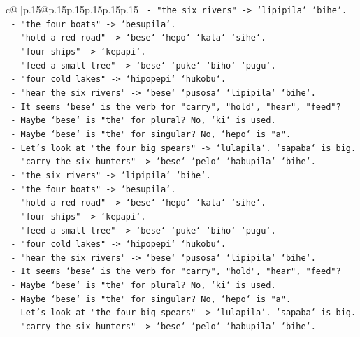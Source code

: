 \documentclass{article}
\begin{document}
{\begin{supertabular}{c@{$\;$}|p{.15\linewidth}@{}p{.15\linewidth}p{.15\linewidth}p{.15\linewidth}p{.15\linewidth}p{.15\linewidth}}
{{{\texttt{    {-} "the six rivers" {-}> `lipipila` `bihe`.} \\
\texttt{    {-} "the four boats" {-}> `besupila`.} \\
\texttt{    {-} "hold a red road" {-}> `bese` `hepo` `kala` `sihe`.} \\
\texttt{    {-} "four ships" {-}> `kepapi`.} \\
\texttt{    {-} "feed a small tree" {-}> `bese` `puke` `biho` `pugu`.} \\
\texttt{    {-} "four cold lakes" {-}> `hipopepi` `hukobu`.} \\
\texttt{    {-} "hear the six rivers" {-}> `bese` `pusosa` `lipipila` `bihe`.} \\
\texttt{    {-} It seems `bese` is the verb for "carry", "hold", "hear", "feed"?} \\
\texttt{    {-} Maybe `bese` is "the" for plural? No, `ki` is used.} \\
\texttt{    {-} Maybe `bese` is "the" for singular? No, `hepo` is "a".} \\
\texttt{    {-} Let's look at "the four big spears" {-}> `lulapila`. `sapaba` is big.} \\
\texttt{    {-} "carry the six hunters" {-}> `bese` `pelo` `habupila` `bihe`.} \\
\texttt{    {-} "the six rivers" {-}> `lipipila` `bihe`.} \\
\texttt{    {-} "the four boats" {-}> `besupila`.} \\
\texttt{    {-} "hold a red road" {-}> `bese` `hepo` `kala` `sihe`.} \\
\texttt{    {-} "four ships" {-}> `kepapi`.} \\
\texttt{    {-} "feed a small tree" {-}> `bese` `puke` `biho` `pugu`.} \\
\texttt{    {-} "four cold lakes" {-}> `hipopepi` `hukobu`.} \\
\texttt{    {-} "hear the six rivers" {-}> `bese` `pusosa` `lipipila` `bihe`.} \\
\texttt{    {-} It seems `bese` is the verb for "carry", "hold", "hear", "feed"?} \\
\texttt{    {-} Maybe `bese` is "the" for plural? No, `ki` is used.} \\
\texttt{    {-} Maybe `bese` is "the" for singular? No, `hepo` is "a".} \\
\texttt{    {-} Let's look at "the four big spears" {-}> `lulapila`. `sapaba` is big.} \\
\texttt{    {-} "carry the six hunters" {-}> `bese` `pelo` `habupila` `bihe`.} \\
}}}
\end{supertabular}}
\end{document}
